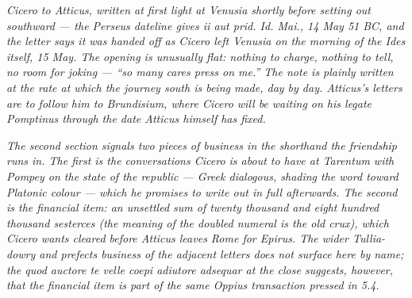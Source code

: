 
\textit{Cicero to Atticus, written at first light at Venusia
shortly before setting out southward --- the Perseus dateline
gives \textit{ii aut prid. Id. Mai.}, 14 May 51 BC, and the
letter says it was handed off as Cicero left Venusia on the
morning of the Ides itself, 15 May. The opening is unusually
flat: nothing to charge, nothing to tell, no room for joking
--- ``so many cares press on me.'' The note is plainly written
at the rate at which the journey south is being made, day by
day. Atticus's letters are to follow him to Brundisium, where
Cicero will be waiting on his legate Pomptinus through the
date Atticus himself has fixed.}

\textit{The second section signals two pieces of business in the
shorthand the friendship runs in. The first is the
conversations Cicero is about to have at Tarentum with Pompey
on the state of the republic --- Greek \textit{dialogous},
shading the word toward Platonic colour --- which he promises
to write out in full afterwards. The second is the financial
item: an unsettled sum of twenty thousand and eight hundred
thousand sesterces (the meaning of the doubled numeral is the
old crux), which Cicero wants cleared before Atticus leaves
Rome for Epirus. The wider Tullia-dowry and prefects business
of the adjacent letters does not surface here by name; the
\textit{quod auctore te velle coepi adiutore adsequar} at the
close suggests, however, that the financial item is part of
the same Oppius transaction pressed in 5.4.}
